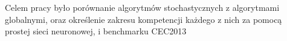 Celem pracy było porównanie algorytmów stochastycznych z algorytmami globalnymi, oraz określenie zakresu kompetencji każdego z nich za pomocą prostej sieci neuronowej, 
i benchmarku CEC2013
